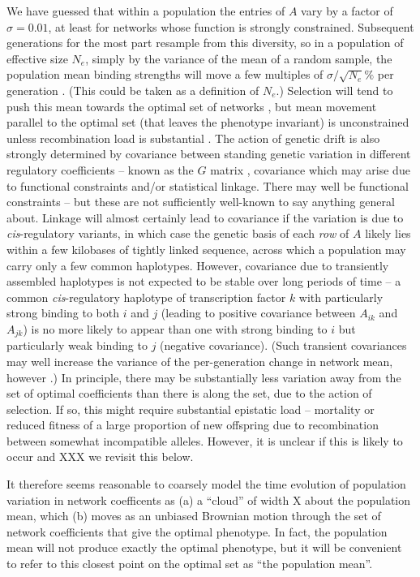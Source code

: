 \documentclass{article}
\newcommand{\1}{\mathbbm{1}}
\begin{document}
  We have guessed that within a population the entries of $A$
  vary by a factor of $\sigma=0.01$, at least for networks whose function is strongly constrained.
  Subsequent generations for the most part resample from this diversity,
  so in a population of effective size $N_e$,
  simply by the variance of the mean of a random sample,
  the population mean binding strengths
  will move a few multiples of $\sigma/\sqrt{N_e}\%$ per generation \citep{lande_drift}.
  (This could be taken as a definition of $N_e$.)
  Selection will tend to push this mean towards the optimal set of networks \citep{ou_process},
  but mean movement parallel to the optimal set (that leaves the phenotype invariant) is unconstrained
  unless recombination load is substantial \citep{recomb_load}.
  The action of genetic drift is also strongly determined by covariance between 
  standing genetic variation in different regulatory coefficients -- known as the $G$ matrix \citep{G_matrix},
  covariance which may arise due to functional constraints and/or statistical linkage.
  There may well be functional constraints -- but these are not sufficiently well-known to say anything general about.
  Linkage will almost certainly lead to covariance
  if the variation is due to \textit{cis}-regulatory variants,
  in which case the genetic basis of each \emph{row} of $A$ likely lies within a few kilobases of tightly linked sequence,
  across which a population may carry only a few common haplotypes.
  However, covariance due to transiently assembled haplotypes is not expected to be stable over long periods of time --
  a common \textit{cis}-regulatory haplotype of transcription factor $k$ with particularly strong binding to both $i$ and $j$
  (leading to positive covariance between $A_{ik}$ and $A_{jk}$)
  is no more likely to appear than one with strong binding to $i$ but particularly weak binding to $j$ (negative covariance).
  (Such transient covariances may well increase the variance of the per-generation change in network mean, however \citep{barton_linkage}.)
  In principle, there may be substantially less variation away from the set of optimal coefficients 
  than there is along the set, due to the action of selection.
  If so, this might require substantial epistatic load 
  -- mortality or reduced fitness of a large proportion of new offspring due to recombination between somewhat incompatible alleles.
  However, it is unclear if this is likely to occur and XXX we revisit this below.

  It therefore seems reasonable to coarsely model the time evolution of population variation in network coefficents as 
  (a) a ``cloud'' of width X about the population mean, 
  which (b) moves as an unbiased Brownian motion through the set of network coefficients that give the optimal phenotype.
  In fact, the population mean will not produce exactly the optimal phenotype,
  but it will be convenient to refer to this closest point on the optimal set as ``the population mean''.
\end{document}
